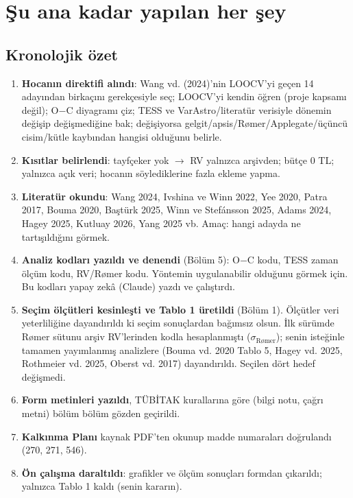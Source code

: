 \documentclass[11pt,a4paper]{article}
\newcommand{\OC}{O$-$C}
\newcommand{\sR}{\ensuremath{\sigma_{\text{Rømer}}}}
\begin{document}
\section{Şu ana kadar yapılan her şey}

\subsection{Kronolojik özet}
\begin{enumerate}
\item \textbf{Hocanın direktifi alındı}: Wang vd. (2024)'nin LOOCV'yi geçen 14 adayından birkaçını gerekçesiyle seç; LOOCV'yi kendin öğren (proje kapsamı değil); \OC{} diyagramı çiz; TESS ve VarAstro/literatür verisiyle dönemin değişip değişmediğine bak; değişiyorsa gelgit/apsis/Rømer/Applegate/üçüncü cisim/kütle kaybından hangisi olduğunu belirle.
\item \textbf{Kısıtlar belirlendi}: tayfçeker yok $\rightarrow$ RV yalnızca arşivden; bütçe 0 TL; yalnızca açık veri; hocanın söylediklerine fazla ekleme yapma.
\item \textbf{Literatür okundu}: Wang 2024, Ivshina ve Winn 2022, Yee 2020, Patra 2017, Bouma 2020, Baştürk 2025, Winn ve Stefánsson 2025, Adams 2024, Hagey 2025, Kutluay 2026, Yang 2025 vb. Amaç: hangi adayda ne tartışıldığını görmek.
\item \textbf{Analiz kodları yazıldı ve denendi} (Bölüm 5): \OC{} kodu, TESS zaman ölçüm kodu, RV/Rømer kodu. Yöntemin uygulanabilir olduğunu görmek için. Bu kodları yapay zekâ (Claude) yazdı ve çalıştırdı.
\item \textbf{Seçim ölçütleri kesinleşti ve Tablo 1 üretildi} (Bölüm 1). Ölçütler veri yeterliliğine dayandırıldı ki seçim sonuçlardan bağımsız olsun. İlk sürümde Rømer sütunu arşiv RV'lerinden kodla hesaplanmıştı (\sR); senin isteğinle tamamen yayımlanmış analizlere (Bouma vd. 2020 Tablo 5, Hagey vd. 2025, Rothmeier vd. 2025, Oberst vd. 2017) dayandırıldı. Seçilen dört hedef değişmedi.
\item \textbf{Form metinleri yazıldı}, TÜBİTAK kurallarına göre (bilgi notu, çağrı metni) bölüm bölüm gözden geçirildi.
\item \textbf{Kalkınma Planı} kaynak PDF'ten okunup madde numaraları doğrulandı (270, 271, 546).
\item \textbf{Ön çalışma daraltıldı}: grafikler ve ölçüm sonuçları formdan çıkarıldı; yalnızca Tablo 1 kaldı (senin kararın).

\end{enumerate}
\end{document}
